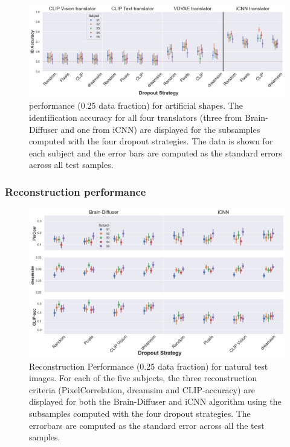 \begin{figure}[ht]
  \centering
  \includegraphics[width=1\textwidth]{plots/dropout_eval_translator_art.png}
  \caption[Experiment 1: Translator performance for artificial shapes]{ performance (0.25 data fraction) for artificial shapes. The identification accuracy for all four translators (three from Brain-Diffuser and one from iCNN) are displayed for the subsamples computed with the four dropout strategies. The data is shown for each subject and the error bars are computed as the standard errors across all test samples.}\label{fig:dropout_eval_translator_art}
\end{figure}


\subsubsection{Reconstruction performance}

\begin{figure}[ht]
  \centering
  \includegraphics[width=1\textwidth]{plots/dropout_eval_reconstruction_test.png}
  \caption[Experiment 1: Reconstruction performance for natural test images]{Reconstruction Performance (0.25 data fraction) for natural test images. For each of the five subjects, the three reconstruction criteria (PixelCorrelation, dreamsim and CLIP-accuracy) are displayed for both the Brain-Diffuser and iCNN algorithm using the subsamples computed with the four dropout strategies. The errorbars are computed as the standard error across all the test samples.}\label{fig:dropout_eval_reconstruction_test}
\end{figure}

